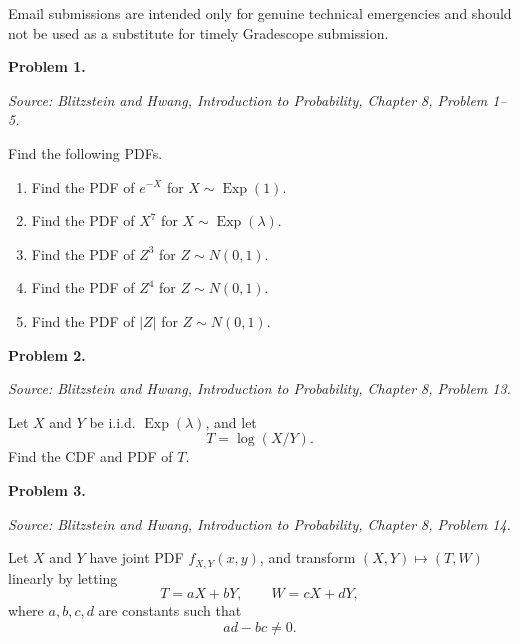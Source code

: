 \documentclass[11pt]{article}
\newcommand{\source}[2]{%
    \vspace{0.15cm}
    {\small\textit{Source: Blitzstein and Hwang, \textit{Introduction to Probability}, Chapter #1, Problem #2.}}
}
\begin{document}
Email submissions are intended only for genuine technical emergencies and should not be used as a substitute for timely Gradescope submission.

\newpage

 


\begin{problemheader}
\textbf{Problem 1.}
\end{problemheader}
\source{8}{1--5}

Find the following PDFs.

\begin{enumerate}[label=(\alph*), leftmargin=*]
    \item Find the PDF of $e^{-X}$ for $X\sim \operatorname{Exp}(1)$.

    \item Find the PDF of $X^7$ for $X\sim \operatorname{Exp}(\lambda)$.

    \item Find the PDF of $Z^3$ for $Z\sim N(0,1)$.

    \item Find the PDF of $Z^4$ for $Z\sim N(0,1)$.

    \item Find the PDF of $|Z|$ for $Z\sim N(0,1)$.
\end{enumerate}
 
\newpage


\begin{problemheader}
\textbf{Problem 2. }
\end{problemheader}
\source{8}{13}

Let $X$ and $Y$ be i.i.d. $\operatorname{Exp}(\lambda)$, and let
\[
T=\log(X/Y).
\]
Find the CDF and PDF of $T$.
 
\newpage


\begin{problemheader}
\textbf{Problem 3.  }
\end{problemheader}
\source{8}{14}

Let $X$ and $Y$ have joint PDF $f_{X,Y}(x,y)$, and transform $(X,Y)\mapsto (T,W)$ linearly by letting
\[
T=aX+bY,
\qquad
W=cX+dY,
\]
where $a,b,c,d$ are constants such that
\[
ad-bc\ne0.
\]
\end{document}
